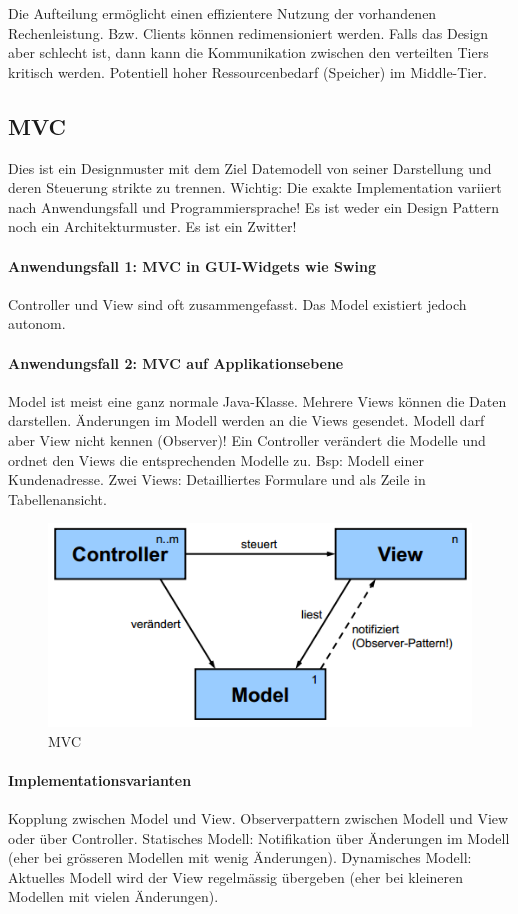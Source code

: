 Die Aufteilung ermöglicht einen effizientere Nutzung der vorhandenen Rechenleistung. Bzw. Clients können redimensioniert werden. Falls das Design aber schlecht ist, dann kann die Kommunikation zwischen den verteilten Tiers kritisch werden. Potentiell hoher Ressourcenbedarf (Speicher) im Middle-Tier.

\subsection{MVC}
Dies ist ein Designmuster mit dem Ziel Datemodell von seiner Darstellung und deren Steuerung strikte zu trennen. Wichtig: Die exakte Implementation variiert nach Anwendungsfall und Programmiersprache! Es ist weder ein Design Pattern noch ein Architekturmuster. Es ist ein Zwitter!

\paragraph{Anwendungsfall 1: MVC in GUI-Widgets wie Swing} Controller und View sind oft zusammengefasst. Das Model existiert jedoch autonom.

\paragraph{Anwendungsfall 2: MVC auf Applikationsebene} Model ist meist eine ganz normale Java-Klasse. Mehrere Views können die Daten darstellen. Änderungen im Modell werden an die Views gesendet. Modell darf aber View nicht kennen (Observer)! Ein Controller verändert die Modelle und ordnet den Views die entsprechenden Modelle zu. Bsp: Modell einer Kundenadresse. Zwei Views: Detailliertes Formulare und als Zeile in Tabellenansicht.

\begin{figure}[h!]
\centering
\includegraphics[width=0.7\linewidth]{fig/mvc}
\caption{MVC}
\label{fig:mvc}
\end{figure}

\paragraph{Implementationsvarianten} Kopplung zwischen Model und View. Observerpattern zwischen Modell und View oder über Controller. Statisches Modell: Notifikation über Änderungen im Modell (eher bei grösseren Modellen mit wenig Änderungen). Dynamisches Modell: Aktuelles Modell wird der View regelmässig übergeben (eher bei kleineren Modellen mit vielen Änderungen).

